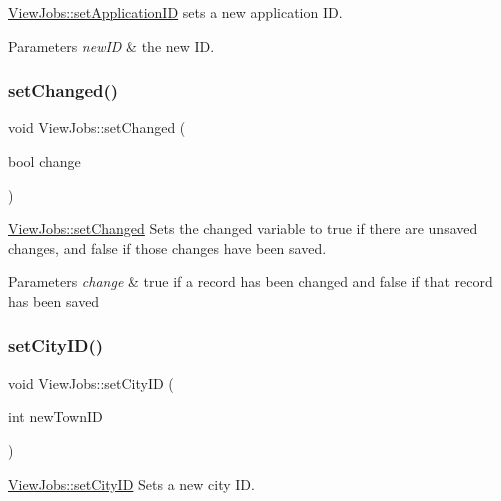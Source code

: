 \hyperlink{class_view_jobs_acd43a8c32ab9bca7e40ecc99e51da9b8}{View\+Jobs\+::set\+Application\+ID} sets a new application ID. 


\begin{DoxyParams}{Parameters}
{\em new\+ID} & the new ID. \\
\hline
\end{DoxyParams}
\mbox{\label{class_view_jobs_a3cba868c6deadaf4b35c18982f7ec35e}} 
\subsubsection{\texorpdfstring{set\+Changed()}{setChanged()}}
{\footnotesize\ttfamily void View\+Jobs\+::set\+Changed (\begin{DoxyParamCaption}\item[{bool}]{change }\end{DoxyParamCaption})}



\hyperlink{class_view_jobs_a3cba868c6deadaf4b35c18982f7ec35e}{View\+Jobs\+::set\+Changed} Sets the changed variable to true if there are unsaved changes, and false if those changes have been saved. 


\begin{DoxyParams}{Parameters}
{\em change} & true if a record has been changed and false if that record has been saved \\
\hline
\end{DoxyParams}
\mbox{\label{class_view_jobs_ad89218b37af85cac9ce6c346efb57e56}} 
\subsubsection{\texorpdfstring{set\+City\+I\+D()}{setCityID()}}
{\footnotesize\ttfamily void View\+Jobs\+::set\+City\+ID (\begin{DoxyParamCaption}\item[{int}]{new\+Town\+ID }\end{DoxyParamCaption})}



\hyperlink{class_view_jobs_ad89218b37af85cac9ce6c346efb57e56}{View\+Jobs\+::set\+City\+ID} Sets a new city ID. 



